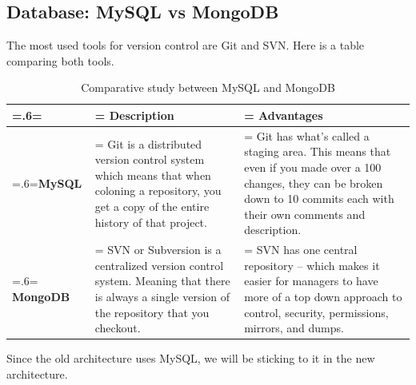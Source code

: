 \subsection{Database: MySQL vs MongoDB}
The most used tools for version control are Git and SVN. Here is a table comparing both tools.
\begin{table}[H]
	\renewcommand{\arraystretch}{1.5}%
	\caption{Comparative study between MySQL and MongoDB}
	\centering
	\medskip
	\begin{tabularx}{1\textwidth} {
			| >{\hsize=.6\hsize\linewidth=\hsize\centering\arraybackslash}X
			| >{\hsize=1.2\hsize\linewidth=\hsize\centering\arraybackslash}X
			| >{\hsize=1.2\hsize\linewidth=\hsize\centering\arraybackslash}X |}
		\hline
		\rowcolor{primary} & \textbf {Description}                                                                                                                          & \textbf {Advantages}                                                                                                                                                           \\
		\hline
		\textbf{MySQL}     & Git is a distributed version control system which means that when coloning a repository, you get a copy of the entire history of that project. & Git has what's called a staging area. This means that even if you made over a 100 changes, they can be broken down to 10 commits each with their own comments and description. \\
		\hline
		\textbf{MongoDB}   & SVN or Subversion is a centralized version control system. Meaning that there is always a single version of the repository that you checkout.  & SVN has one central repository – which makes it easier for managers to have more of a top down approach to control, security, permissions, mirrors, and dumps.                 \\
		\hline
	\end{tabularx}
\end{table}
Since the old architecture uses MySQL, we will be sticking to it in the new architecture.

